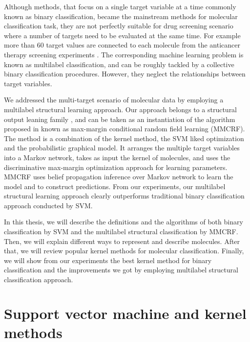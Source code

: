 \documentclass[english]{tktltiki}
\begin{document}
Although methods, that focus on a single target variable at a time commonly known as binary classification, became the mainstream methods for molecular classification task, they are not perfectly suitable for drug screening scenario where a number of targets need to be evaluated at the same time. For example more than $60$ target values are connected to each molecule from the anticancer therapy screening experiments \cite{wang09b}. The corresponding machine learning problem is known as multilabel classification, and can be roughly tackled by a collective binary classification procedures. However, they neglect the relationships between target variables. 

We addressed the multi-target scenario of molecular data by employing a multilabel structural learning approach. Our approach belongs to a structural output leaning family \cite{taskar03,THJA04,rousu2006kbl,rousu2007}, and can be taken as an instantiation of the algorithm proposed in \cite{rousu2006kbl, rousu2007} known as max-margin conditional random field learning (MMCRF). The method is a combination of the kernel method, the SVM liked optimization and the probabilistic graphical model. It arranges the multiple target variables into a Markov network, takes as input the kernel of molecules, and uses the discriminative max-margin optimization approach for learning parameters. MMCRF uses belief propagation inference over Markov network to learn the model and to construct predictions. From our experiments, our multilabel structural learning approach clearly outperforms traditional binary classification approach conducted by SVM.

In this thesis, we will describe the definitions and the algorithms of both binary classification by SVM and the multilabel structural classification by MMCRF. Then, we will explain different ways to represent and describe molecules. After that, we will review popular kernel methods for molecular classification. Finally, we will show from our experiments the best kernel method for binary classification and the improvements we got by employing multilabel structural classification approach.


%
%
\clearpage
\section{Support vector machine and kernel methods}
\end{document}
